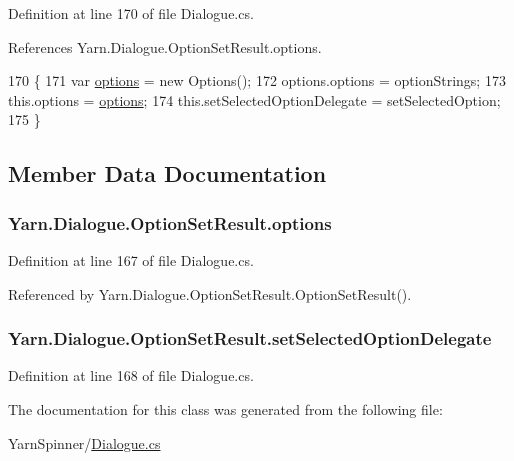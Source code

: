 Definition at line 170 of file Dialogue.\-cs.



References Yarn.\-Dialogue.\-Option\-Set\-Result.\-options.


\begin{DoxyCode}
170                                                                                                   \{
171                 var \hyperlink{a00134_abda9c3047ff9d3c3ec5540566a239315}{options} = \textcolor{keyword}{new} Options();
172                 options.options = optionStrings;
173                 this.options = \hyperlink{a00134_abda9c3047ff9d3c3ec5540566a239315}{options};
174                 this.setSelectedOptionDelegate = setSelectedOption;
175             \}
\end{DoxyCode}


\subsection{Member Data Documentation}
\hypertarget{a00134_abda9c3047ff9d3c3ec5540566a239315}{
\subsubsection[{options}]{ Yarn.\-Dialogue.\-Option\-Set\-Result.\-options}}\label{a00134_abda9c3047ff9d3c3ec5540566a239315}


Definition at line 167 of file Dialogue.\-cs.



Referenced by Yarn.\-Dialogue.\-Option\-Set\-Result.\-Option\-Set\-Result().

\hypertarget{a00134_a6f2683598cf0f62b76bb864640cc79dd}{
\subsubsection[{set\-Selected\-Option\-Delegate}]{ Yarn.\-Dialogue.\-Option\-Set\-Result.\-set\-Selected\-Option\-Delegate}}\label{a00134_a6f2683598cf0f62b76bb864640cc79dd}


Definition at line 168 of file Dialogue.\-cs.



The documentation for this class was generated from the following file\-:\begin{DoxyCompactItemize}
\item 
Yarn\-Spinner/\hyperlink{a00282}{Dialogue.\-cs}\end{DoxyCompactItemize}
